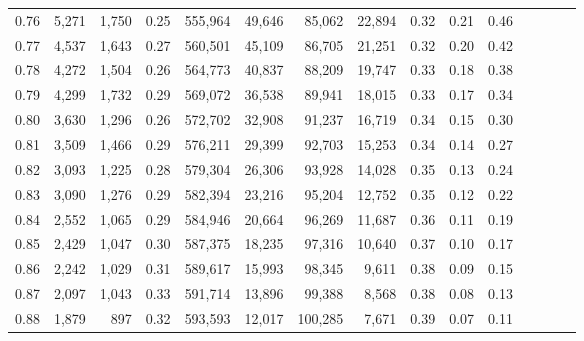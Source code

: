 \begin{tabular}{rrrcrrrrrrrrrrr}
0.76 &   5,271 &  1,750 &                                       0.25 &  555,964 &   49,646 &   85,062 &   22,894 &  0.32 &  0.21 &                         0.46 \\
0.77 &   4,537 &  1,643 &                                       0.27 &  560,501 &   45,109 &   86,705 &   21,251 &  0.32 &  0.20 &                         0.42 \\
0.78 &   4,272 &  1,504 &                                       0.26 &  564,773 &   40,837 &   88,209 &   19,747 &  0.33 &  0.18 &                         0.38 \\
0.79 &   4,299 &  1,732 &                                       0.29 &  569,072 &   36,538 &   89,941 &   18,015 &  0.33 &  0.17 &                         0.34 \\
0.80 &   3,630 &  1,296 &                                       0.26 &  572,702 &   32,908 &   91,237 &   16,719 &  0.34 &  0.15 &                         0.30 \\
0.81 &   3,509 &  1,466 &                                       0.29 &  576,211 &   29,399 &   92,703 &   15,253 &  0.34 &  0.14 &                         0.27 \\
0.82 &   3,093 &  1,225 &                                       0.28 &  579,304 &   26,306 &   93,928 &   14,028 &  0.35 &  0.13 &                         0.24 \\
0.83 &   3,090 &  1,276 &                                       0.29 &  582,394 &   23,216 &   95,204 &   12,752 &  0.35 &  0.12 &                         0.22 \\
0.84 &   2,552 &  1,065 &                                       0.29 &  584,946 &   20,664 &   96,269 &   11,687 &  0.36 &  0.11 &                         0.19 \\
0.85 &   2,429 &  1,047 &                                       0.30 &  587,375 &   18,235 &   97,316 &   10,640 &  0.37 &  0.10 &                         0.17 \\
0.86 &   2,242 &  1,029 &                                       0.31 &  589,617 &   15,993 &   98,345 &    9,611 &  0.38 &  0.09 &                         0.15 \\
0.87 &   2,097 &  1,043 &                                       0.33 &  591,714 &   13,896 &   99,388 &    8,568 &  0.38 &  0.08 &                         0.13 \\
0.88 &   1,879 &    897 &                                       0.32 &  593,593 &   12,017 &  100,285 &    7,671 &  0.39 &  0.07 &                         0.11 \\

\end{tabular}
